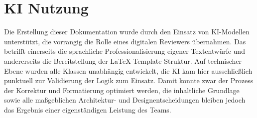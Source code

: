 \section{KI Nutzung}
Die Erstellung dieser Dokumentation wurde durch den Einsatz von KI-Modellen unterstützt, die vorrangig die Rolle eines digitalen Reviewers übernahmen. 
Das betrifft einerseits die sprachliche Professionalisierung eigener Textentwürfe und andererseits die Bereitstellung der LaTeX-Template-Struktur. 
Auf technischer Ebene wurden alle Klassen unabhängig entwickelt, die KI kam hier ausschließlich punktuell zur Validierung der Logik zum Einsatz. 
Damit konnte zwar der Prozess der Korrektur und Formatierung optimiert werden, die inhaltliche Grundlage sowie alle maßgeblichen Architektur- und Designentscheidungen bleiben jedoch das Ergebnis einer eigenständigen Leistung des Teams.